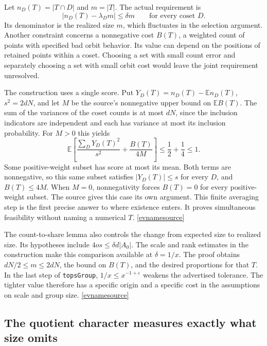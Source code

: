 \documentclass[11pt,letterpaper]{article}
\newcommand{\evref}[1]{\hyperlink{ev-#1}{\textsf{\small[\csname evname#1\endcsname]}}}
\begin{document}
Let \(n_D(T)=|T\cap D|\) and \(m=|T|\). The actual requirement is
\[
  \bigl|n_D(T)-\lambda_D m\bigr|\leq \delta m
  \qquad\text{for every coset }D.
\]
Its denominator is the realized size \(m\), which fluctuates in the selection argument. Another constraint concerns a nonnegative cost \(B(T)\), a weighted count of points with specified bad orbit behavior. Its value can depend on the positions of retained points within a coset. Choosing a set with small count error and separately choosing a set with small orbit cost would leave the joint requirement unresolved.

The construction uses a single score. Put \(Y_D(T)=n_D(T)-\mathbb E n_D(T)\), \(s^2=2dN\), and let \(M\) be the source's nonnegative upper bound on \(\mathbb E B(T)\). The sum of the variances of the coset counts is at most \(dN\), since the inclusion indicators are independent and each has variance at most its inclusion probability. For \(M>0\) this yields
\[
 \mathbb E\!\left[\frac{\sum_D Y_D(T)^2}{s^2}
                   +\frac{B(T)}{4M}\right]
 \leq \frac12+\frac14 \leq 1 .
\]
Some positive-weight subset has score at most its mean. Both terms are nonnegative, so this same subset satisfies \(|Y_D(T)|\leq s\) for every \(D\), and \(B(T)\leq4M\). When \(M=0\), nonnegativity forces \(B(T)=0\) for every positive-weight subset. The source gives this case its own argument. This finite averaging step is the first precise answer to where existence enters. It proves simultaneous feasibility without naming a numerical \(T\). \evref{source}

The count-to-share lemma also controls the change from expected size to realized size. Its hypotheses include \(4os\leq \delta d|A_0|\). The scale and rank estimates in the construction make this comparison available at \(\delta=1/x\). The proof obtains \(dN/2\leq m\leq2dN\), the bound on \(B(T)\), and the desired proportions for that \(T\). In the last step of \texttt{topsGroup}, \(1/x\leq x^{-1+\varepsilon}\) weakens the advertised tolerance. The tighter value therefore has a specific origin and a specific cost in the assumptions on scale and group size. \evref{source}

\subsection{The quotient character measures exactly what size omits}
\end{document}

